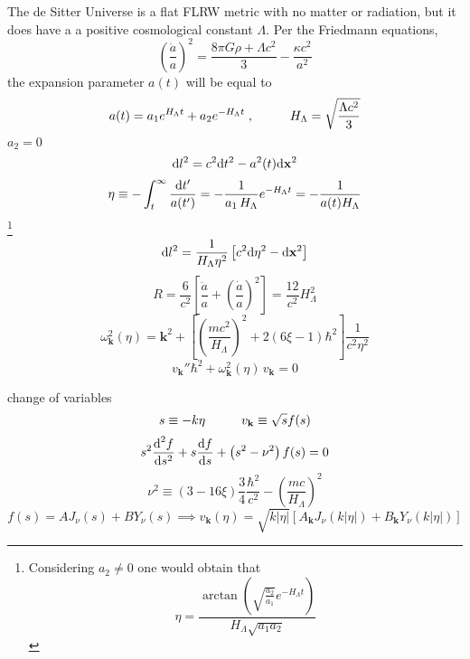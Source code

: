 The de Sitter Universe is a flat FLRW metric with no matter or radiation, but it does have a a positive cosmological constant $\Lambda$. Per the Friedmann equations,
\begin{equation}
	\left(\frac{\dot{a}}{a}\right)^2=\frac{8\pi G\rho+\Lambda c^2}{3}-\frac{\kappa c^2}{a^2}
\end{equation}
the expansion parameter $a(t)$ will be equal to
\begin{equation}
	a(t)=a_1e^{H_\Lambda t}+a_2e^{-H_\Lambda t}\;,\hspace{1.0cm} H_\Lambda=\sqrt{\frac{\Lambda c^2}{3}}
\end{equation}
$a_2=0$
\begin{equation}
	\text{d} l^2=c^2\text{d} t^2-a^2(t)\text{d}\mathbf{x}^2
\end{equation}
\begin{equation}
	\eta\equiv -\int_t^\infty\frac{\text{d} t'}{a(t')}=-\frac{1}{a_1\,H_\Lambda}e^{-H_\Lambda t}=-\frac{1}{a(t)H_\Lambda}
\end{equation}
\footnote{Considering $a_2\not=0$ one would obtain that
$$\eta=\frac{\arctan\left(\sqrt{\frac{a_2}{a_1}}e^{-H_\Lambda t}\right)}{H_\Lambda\sqrt{a_1a_2}}$$}
\begin{equation}
	\text{d} l^2= \frac{1}{H_\Lambda\eta^2}\left[c^2\text{d}\eta^2-\text{d} \mathbf{x}^2\right]
\end{equation}
\begin{equation}
	R=\frac{6}{c^2}\left[\frac{\ddot{a}}{a}+\left(\frac{\dot{a}}{a}\right)^2\right]=\frac{12}{c^2}H_\Lambda^2
\end{equation}
\begin{equation}
	\omega^2_\mathbf{k}(\eta)=\mathbf{k}^2+\left[\left(\frac{mc^2}{H_\Lambda}\right)^2+2\left(6\xi-1\right)\hbar^2\right]\frac{1}{c^2\eta^2}
\end{equation}
\begin{equation}
	v_\mathbf{k}''\hbar^2+\omega^2_\mathbf{k}(\eta)\,v_\mathbf{k}=0
\end{equation}

change of variables
\begin{equation}
	s\equiv -k\eta\hspace{1.0cm}v_\mathbf{k}\equiv \sqrt{s}f(s)
\end{equation}
\begin{equation}
	s^2\frac{\text{d}^2f}{\text{d} s^2}+s\frac{\text{d} f}{\text{d} s}+\left(s^2-\nu^2\right)f(s)=0
\end{equation}
\begin{equation}
	\nu^2\equiv \left(3-16\xi\right)\frac{3}{4}\frac{\hbar^2}{c^2}-\left(\frac{mc}{H_\Lambda}\right)^2
\end{equation}
\begin{equation}
	f(s)=AJ_\nu(s)+BY_\nu(s)\implies v_\mathbf{k}(\eta)=\sqrt{k|\eta|}\left[A_\mathbf{k}J_\nu(k|\eta|)+B_\mathbf{k}Y_\nu(k|\eta|)\right]
\end{equation}